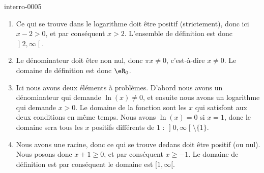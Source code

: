 
\begin{corrige}{interro-0005}

    \begin{enumerate}
        \item
            Ce qui se trouve dans le logarithme doit être positif (strictement), donc ici $x-2>0$, et par conséquent $x>2$. L'ensemble de définition est donc $\mathopen] 2 , \infty \mathclose[$.
        \item
            Le dénominateur doit être non nul, donc $\pi x\neq 0$, c'est-à-dire $x\neq 0$. Le domaine de définition est donc $\eR_0$.
        \item
            Ici nous avons deux éléments à problèmes. D'abord nous avons un dénominateur qui demande $\ln(x)\neq 0$, et ensuite nous avons un logarithme qui demande $x>0$. Le domaine de la fonction sont les $x$ qui satisfont aux deux conditions en même temps. Nous avons $\ln(x)=0$ si $x=1$, donc le domaine sera tous les $x$ positifs différents de $1$ : $\mathopen] 0 , \infty \mathclose[\setminus\{ 1 \}$.
        \item
            Nous avons une racine, donc ce qui se trouve dedans doit être positif (ou nul). Nous posons donc $x+1\geq 0$, et par conséquent $x\geq -1$. Le domaine de définition est par conséquent le domaine est \( \mathopen[ 1 , \infty [\).
    \end{enumerate}

\end{corrige}
